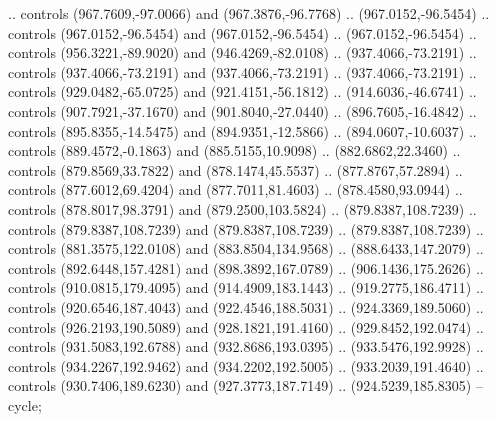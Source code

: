 \begin{scope}[shift={(-127.26916,-608.18524)}]
\begin{scope}
\begin{scope}[shift={(-630.60299,773.9938)},opacity=0.500,transparency group]
        .. controls (967.7609,-97.0066) and (967.3876,-96.7768) .. (967.0152,-96.5454)
        .. controls (967.0152,-96.5454) and (967.0152,-96.5454) .. (967.0152,-96.5454)
        .. controls (956.3221,-89.9020) and (946.4269,-82.0108) .. (937.4066,-73.2191)
        .. controls (937.4066,-73.2191) and (937.4066,-73.2191) .. (937.4066,-73.2191)
        .. controls (929.0482,-65.0725) and (921.4151,-56.1812) .. (914.6036,-46.6741)
        .. controls (907.7921,-37.1670) and (901.8040,-27.0440) .. (896.7605,-16.4842)
        .. controls (895.8355,-14.5475) and (894.9351,-12.5866) .. (894.0607,-10.6037)
        .. controls (889.4572,-0.1863) and (885.5155,10.9098) .. (882.6862,22.3460) ..
        controls (879.8569,33.7822) and (878.1474,45.5537) .. (877.8767,57.2894) ..
        controls (877.6012,69.4204) and (877.7011,81.4603) .. (878.4580,93.0944) ..
        controls (878.8017,98.3791) and (879.2500,103.5824) .. (879.8387,108.7239) ..
        controls (879.8387,108.7239) and (879.8387,108.7239) .. (879.8387,108.7239) ..
        controls (881.3575,122.0108) and (883.8504,134.9568) .. (888.6433,147.2079) ..
        controls (892.6448,157.4281) and (898.3892,167.0789) .. (906.1436,175.2626) ..
        controls (910.0815,179.4095) and (914.4909,183.1443) .. (919.2775,186.4711) ..
        controls (920.6546,187.4043) and (922.4546,188.5031) .. (924.3369,189.5060) ..
        controls (926.2193,190.5089) and (928.1821,191.4160) .. (929.8452,192.0474) ..
        controls (931.5083,192.6788) and (932.8686,193.0395) .. (933.5476,192.9928) ..
        controls (934.2267,192.9462) and (934.2202,192.5005) .. (933.2039,191.4640) ..
        controls (930.7406,189.6230) and (927.3773,187.7149) .. (924.5239,185.8305) --
        cycle;


\end{scope}
\end{scope}
\end{scope}
